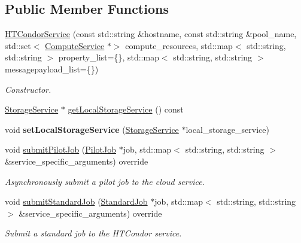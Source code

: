 \subsection*{Public Member Functions}
\begin{DoxyCompactItemize}
\item 
\hyperlink{classwrench_1_1_h_t_condor_service_a4632c26bb4c08757ac2ceeb57cd8e2d3}{H\+T\+Condor\+Service} (const std\+::string \&hostname, const std\+::string \&pool\+\_\+name, std\+::set$<$ \hyperlink{classwrench_1_1_compute_service}{Compute\+Service} $\ast$$>$ compute\+\_\+resources, std\+::map$<$ std\+::string, std\+::string $>$ property\+\_\+list=\{\}, std\+::map$<$ std\+::string, std\+::string $>$ messagepayload\+\_\+list=\{\})
\begin{DoxyCompactList}\small\item\em Constructor. \end{DoxyCompactList}\item 
\hyperlink{classwrench_1_1_storage_service}{Storage\+Service} $\ast$ \hyperlink{classwrench_1_1_h_t_condor_service_a4c8a4111afff9952e90d210a8b0bdf35}{get\+Local\+Storage\+Service} () const
\item 
\mbox{\label{classwrench_1_1_h_t_condor_service_a21750683c0445a8d208ef3862a2cea21}} 
void {\bfseries set\+Local\+Storage\+Service} (\hyperlink{classwrench_1_1_storage_service}{Storage\+Service} $\ast$local\+\_\+storage\+\_\+service)
\item 
void \hyperlink{classwrench_1_1_h_t_condor_service_a1fac4517c82ac0b0737cd6ca75bba952}{submit\+Pilot\+Job} (\hyperlink{classwrench_1_1_pilot_job}{Pilot\+Job} $\ast$job, std\+::map$<$ std\+::string, std\+::string $>$ \&service\+\_\+specific\+\_\+arguments) override
\begin{DoxyCompactList}\small\item\em Asynchronously submit a pilot job to the cloud service. \end{DoxyCompactList}\item 
void \hyperlink{classwrench_1_1_h_t_condor_service_a686a511797b0d6250e7d22941c427ef3}{submit\+Standard\+Job} (\hyperlink{classwrench_1_1_standard_job}{Standard\+Job} $\ast$job, std\+::map$<$ std\+::string, std\+::string $>$ \&service\+\_\+specific\+\_\+arguments) override
\begin{DoxyCompactList}\small\item\em Submit a standard job to the H\+T\+Condor service. \end{DoxyCompactList}\end{DoxyCompactItemize}
